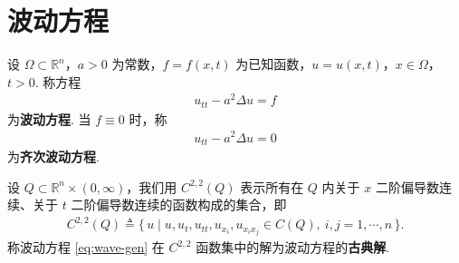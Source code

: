 \documentclass[../main.tex]{subfiles} %
\begin{document}
\chapter{波动方程}

\begin{definition}[波动方程]
设 $\Omega\subset\mathbb{R}^n$，$a>0$ 为常数，$f=f(x,t)$ 为已知函数，$u=u(x,t)$，$x\in\Omega$，$t>0$. 称方程
\begin{align}
u_{tt}-a^2\Delta u=f \label{eq:wave-gen}
\end{align}
为\textbf{波动方程}. 当 $f\equiv 0$ 时，称
\begin{align*}
u_{tt}-a^2\Delta u=0
\end{align*}
为\textbf{齐次波动方程}.
\end{definition}

\begin{definition}
设 $Q\subset \mathbb{R}^n\times(0,\infty)$，我们用 $C^{2,2}(Q)$ 表示所有在 $Q$ 内关于 $x$ 二阶偏导数连续、关于 $t$ 二阶偏导数连续的函数构成的集合，即
\begin{align*}
C^{2,2}(Q) \triangleq \{\, u \mid u, u_t, u_{tt}, u_{x_i}, u_{x_ix_j} \in C(Q),\ i,j=1,\cdots,n\,\}.
\end{align*}
称波动方程 \eqref{eq:wave-gen} 在 $C^{2,2}$ 函数集中的解为波动方程的\textbf{古典解}.
\end{definition}
\end{document}
